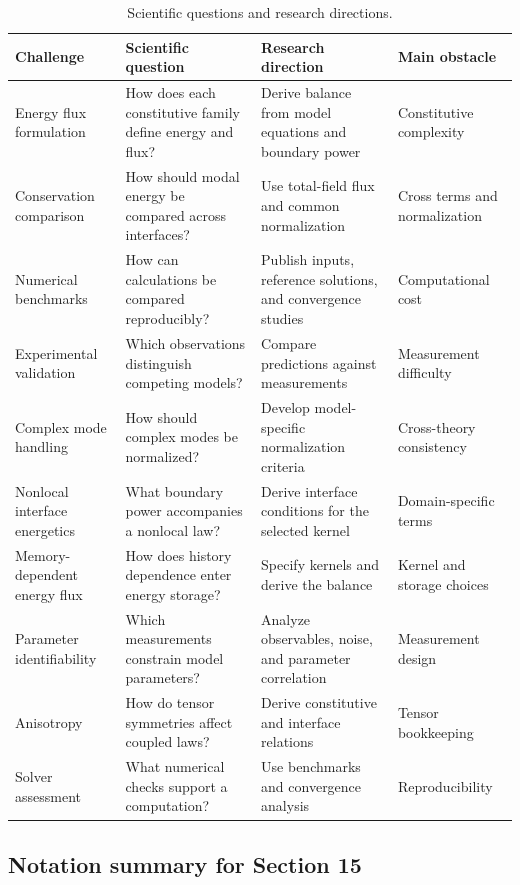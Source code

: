 \begin{table}[htbp]
\centering
\small
\caption{Scientific questions and research directions.}
\label{tab:challenges_summary}
\begin{tabularx}{\textwidth}{@{}p{2.4cm}XXX@{}}
\toprule
\textbf{Challenge} & \textbf{Scientific question} & \textbf{Research direction} & \textbf{Main obstacle} \\
\midrule
Energy flux formulation & How does each constitutive family define energy and flux? & Derive balance from model equations and boundary power & Constitutive complexity \\
Conservation comparison & How should modal energy be compared across interfaces? & Use total-field flux and common normalization & Cross terms and normalization \\
Numerical benchmarks & How can calculations be compared reproducibly? & Publish inputs, reference solutions, and convergence studies & Computational cost \\
Experimental validation & Which observations distinguish competing models? & Compare predictions against measurements & Measurement difficulty \\
Complex mode handling & How should complex modes be normalized? & Develop model-specific normalization criteria & Cross-theory consistency \\
Nonlocal interface energetics & What boundary power accompanies a nonlocal law? & Derive interface conditions for the selected kernel & Domain-specific terms \\
Memory-dependent energy flux & How does history dependence enter energy storage? & Specify kernels and derive the balance & Kernel and storage choices \\
Parameter identifiability & Which measurements constrain model parameters? & Analyze observables, noise, and parameter correlation & Measurement design \\
Anisotropy & How do tensor symmetries affect coupled laws? & Derive constitutive and interface relations & Tensor bookkeeping \\
Solver assessment & What numerical checks support a computation? & Use benchmarks and convergence analysis & Reproducibility \\
\bottomrule
\end{tabularx}
\end{table}

\subsection{Notation summary for Section 15}

